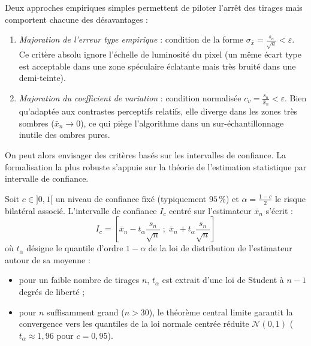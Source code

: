 \begin{proposition}
    Deux approches empiriques simples permettent de piloter l'arrêt des tirages mais comportent chacune des désavantages :
    \begin{enumerate}
        \item \emph{Majoration de l'erreur type empirique} : condition de la forme $\sigma_{\bar{x}} = \frac{s_n}{\sqrt{n}} < \varepsilon$. Ce critère absolu ignore l'échelle de luminosité du pixel (un même écart type est acceptable dans une zone spéculaire éclatante mais très bruité dans une demi-teinte).
        \item \emph{Majoration du coefficient de variation} : condition normalisée $c_v = \frac{s_n}{\bar{x}_n} < \varepsilon$. Bien qu'adaptée aux contrastes perceptifs relatifs, elle diverge dans les zones très sombres ($\bar{x}_n \to 0$), ce qui piège l'algorithme dans un sur-échantillonnage inutile des ombres pures.
    \end{enumerate}    
\end{proposition}

On peut alors envisager des critères basés sur les intervalles de confiance. 
La formalisation la plus robuste s'appuie sur la théorie de l'estimation statistique par intervalle de confiance.

\begin{definition}
    Soit $c \in ]0, 1[$ un niveau de confiance fixé (typiquement $95\,\%$) et $\alpha = \frac{1-c}{2}$ le risque bilatéral associé. L'intervalle de confiance $I_c$ centré sur l'estimateur $\bar{x}_n$ s'écrit :
    \begin{equation}
        I_c = \left[ \bar{x}_n - t_\alpha \frac{s_n}{\sqrt{n}} \; ; \; \bar{x}_n + t_\alpha \frac{s_n}{\sqrt{n}} \right]
    \end{equation}
    où $t_\alpha$ désigne le quantile d'ordre $1-\alpha$ de la loi de distribution de l'estimateur autour de sa moyenne :
    \begin{itemize}
        \item pour un faible nombre de tirages $n$, $t_\alpha$ est extrait d'une loi de Student à $n-1$ degrés de liberté ;
        \item pour $n$ suffisamment grand ($n > 30$), le théorème central limite garantit la convergence vers les quantiles de la loi normale centrée réduite $\mathcal{N}(0, 1)$ ($t_\alpha \approx 1{,}96$ pour $c = 0{,}95$).
    \end{itemize}
\end{definition}

